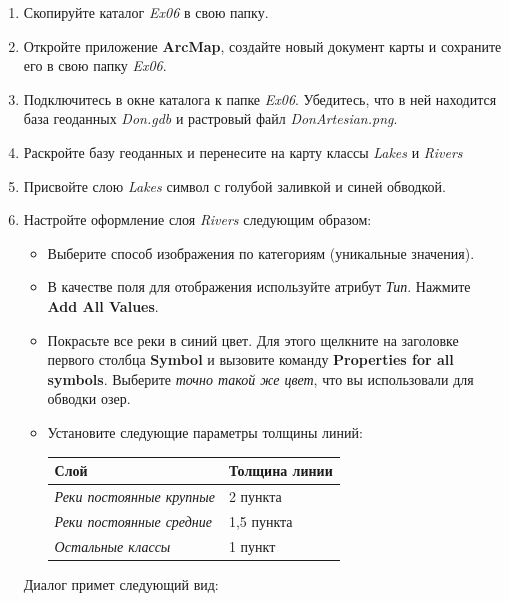 \documentclass[12pt,]{book}
\begin{document}
\begin{enumerate}
\def\labelenumi{\arabic{enumi}.}
\item
  Скопируйте каталог \emph{Ex06} в свою папку.
\item
  Откройте приложение \textbf{ArcMap}, создайте новый документ карты и сохраните его в свою папку \emph{Ex06}.
\item
  Подключитесь в окне каталога к папке \emph{Ex06}. Убедитесь, что в ней находится база геоданных \emph{Don.gdb} и растровый файл \emph{DonArtesian.png}.
\item
  Раскройте базу геоданных и перенесите на карту классы \emph{Lakes} и \emph{Rivers}
\item
  Присвойте слою \emph{Lakes} символ с голубой заливкой и синей обводкой.
\item
  Настройте оформление слоя \emph{Rivers} следующим образом:

  \begin{itemize}
  \item
    Выберите способ изображения по категориям (уникальные значения).
  \item
    В качестве поля для отображения используйте атрибут \emph{Тип}. Нажмите \textbf{Add All Values}.
  \item
    Покрасьте все реки в синий цвет. Для этого щелкните на заголовке первого столбца \textbf{Symbol} и вызовите команду \textbf{Properties for all symbols}. Выберите \emph{точно такой же цвет}, что вы использовали для обводки озер.
  \item
    Установите следующие параметры толщины линий:

    \begin{longtable}[]{@{}ll@{}}
    \toprule
    Слой & Толщина линии\tabularnewline
    \midrule
    \endhead
    \emph{Реки постоянные крупные} & 2 пункта\tabularnewline
    \emph{Реки постоянные средние} & 1,5 пункта\tabularnewline
    \emph{Остальные классы} & 1 пункт\tabularnewline
    \bottomrule
    \end{longtable}
  \end{itemize}

  Диалог примет следующий вид:


\end{enumerate}
\end{document}
